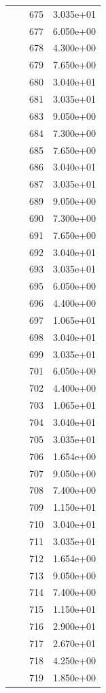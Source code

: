 \documentclass[12pt]{article}
\begin{document}
\begin{longtable}{@{}cccc@{}}
 &  & 675 & 3.035e+01 \\
 &  & 677 & 6.050e+00 \\
 &  & 678 & 4.300e+00 \\
 &  & 679 & 7.650e+00 \\
 &  & 680 & 3.040e+01 \\
 &  & 681 & 3.035e+01 \\
 &  & 683 & 9.050e+00 \\
 &  & 684 & 7.300e+00 \\
 &  & 685 & 7.650e+00 \\
 &  & 686 & 3.040e+01 \\
 &  & 687 & 3.035e+01 \\
 &  & 689 & 9.050e+00 \\
 &  & 690 & 7.300e+00 \\
 &  & 691 & 7.650e+00 \\
 &  & 692 & 3.040e+01 \\
 &  & 693 & 3.035e+01 \\
 &  & 695 & 6.050e+00 \\
 &  & 696 & 4.400e+00 \\
 &  & 697 & 1.065e+01 \\
 &  & 698 & 3.040e+01 \\
 &  & 699 & 3.035e+01 \\
 &  & 701 & 6.050e+00 \\
 &  & 702 & 4.400e+00 \\
 &  & 703 & 1.065e+01 \\
 &  & 704 & 3.040e+01 \\
 &  & 705 & 3.035e+01 \\
 &  & 706 & 1.654e+00 \\
 &  & 707 & 9.050e+00 \\
 &  & 708 & 7.400e+00 \\
 &  & 709 & 1.150e+01 \\
 &  & 710 & 3.040e+01 \\
 &  & 711 & 3.035e+01 \\
 &  & 712 & 1.654e+00 \\
 &  & 713 & 9.050e+00 \\
 &  & 714 & 7.400e+00 \\
 &  & 715 & 1.150e+01 \\
 &  & 716 & 2.900e+01 \\
 &  & 717 & 2.670e+01 \\
 &  & 718 & 4.250e+00 \\
 &  & 719 & 1.850e+00 \\

\end{longtable}
\end{document}
